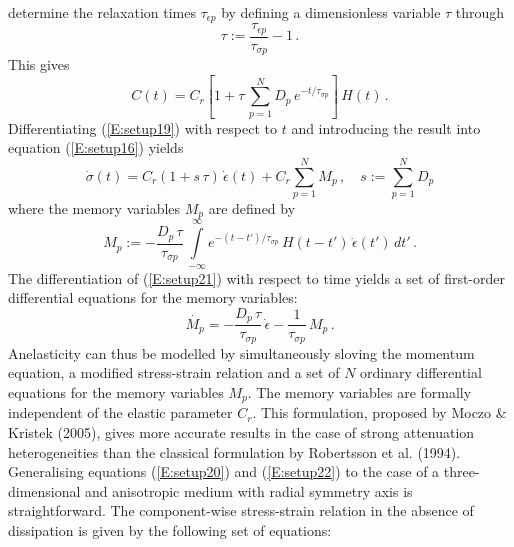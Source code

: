 determine the relaxation times $\tau_{\epsilon p}$ by defining a
dimensionless variable $\tau$ through
\begin{equation}\label{E:setup18}
\tau := \frac{\tau_{\epsilon p}}{\tau_{\sigma p}} -1\, .
\end{equation}
This gives
\begin{equation}\label{E:setup19}
C(t) = C_r \left[ 1+\tau\, \sum_{p=1}^{N} D_p\, e^{-t/\tau_{\sigma
p}} \right]\, H(t)\,.
\end{equation}
Differentiating (\ref{E:setup19}) with respect to $t$ and
introducing the result into equation (\ref{E:setup16}) yields
\begin{equation}\label{E:setup20}
\dot{\sigma}(t) = C_r (1+s\,\tau)\,\dot{\epsilon}(t) + C_r
\sum_{p=1}^{N} M_p\,,\quad s:=\sum_{p=1}^N D_p
\end{equation}
where the memory variables $M_p$ are defined by
\begin{equation}\label{E:setup21}
M_p := -\frac{D_p\,\tau}{\tau_{\sigma
p}}\,\int\limits_{-\infty}^{\infty} e^{-(t-t')/\tau_{\sigma p}}\,
H(t-t')\,\dot{\epsilon}(t')\, dt'\,.
\end{equation}
The differentiation of (\ref{E:setup21}) with respect to time yields
a set of first-order differential equations for the memory
variables:
\begin{equation}\label{E:setup22}
\dot{M_p} = -\frac{D_p\,\tau}{\tau_{\sigma p}} \, \dot{\epsilon} -
\frac{1}{\tau_{\sigma p}}\, M_p\,.
\end{equation}
Anelasticity can thus be modelled by simultaneously sloving the
momentum equation, a modified stress-strain relation and a set of
$N$ ordinary differential equations for the memory variables $M_p$.
The memory variables are formally independent of the elastic
parameter $C_r$. This formulation, proposed by Moczo \& Kristek
(2005), gives more accurate results in the case of strong attenuation heterogeneities than the classical formulation by Robertsson et al. (1994).\\
Generalising equations (\ref{E:setup20}) and (\ref{E:setup22}) to
the case of a three-dimensional and anisotropic medium with radial
symmetry axis is straightforward. The component-wise stress-strain
relation in the absence of dissipation is given by the following set
of equations:
